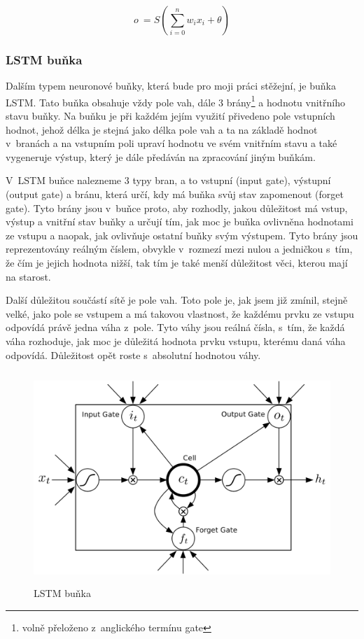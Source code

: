 \documentclass[a4paper]{article}
\begin{document}
$$
	o~= S(\sum\limits_{i=0}^n w_ix_i + \theta)
$$
 \subsubsection{LSTM  buňka}
 Dalším typem neuronové buňky, která bude pro moji práci stěžejní, je buňka LSTM. Tato buňka obsahuje vždy pole vah, dále 3 brány\footnote{volně přeloženo z~anglického termínu gate} a hodnotu vnitřního stavu buňky. Na buňku je při každém jejím využití přivedeno pole vstupních hodnot, jehož délka je stejná jako délka pole vah a ta na základě hodnot v~branách a na vstupním poli upraví hodnotu ve svém vnitřním stavu a také vygeneruje výstup, který je dále předáván na zpracování jiným buňkám.\par
V~LSTM buňce nalezneme 3 typy bran, a to vstupní (input gate), výstupní (output gate) a bránu, která určí, kdy má buňka svůj stav zapomenout (forget gate). Tyto brány jsou v~buňce proto, aby rozhodly, jakou důležitost má vstup, výstup a vnitřní stav buňky a určují tím, jak moc je buňka ovlivněna hodnotami ze vstupu a naopak, jak ovlivňuje ostatní buňky svým výstupem. Tyto brány jsou reprezentovány reálným číslem, obvykle v~rozmezí mezi nulou a jedničkou s~tím, že čím je jejich hodnota nižší, tak tím je také menší důležitost věci, kterou mají na starost.\par
Další důležitou součástí sítě je pole vah. Toto pole je, jak jsem již zmínil, stejně velké, jako pole se vstupem a má takovou vlastnost, že každému prvku ze vstupu odpovídá právě jedna váha z~pole. Tyto váhy jsou reálná čísla, s~tím, že každá váha rozhoduje, jak moc je důležitá hodnota prvku vstupu, kterému daná váha odpovídá. Důležitost opět roste s~absolutní hodnotou váhy.\par
\begin{figure}[h]
	\includegraphics[width=14cm, height=8cm]{LSTM-cell.png}
	\caption{LSTM buňka}
	\label{odkaz}
	\centering
\end{figure}
\end{document}
